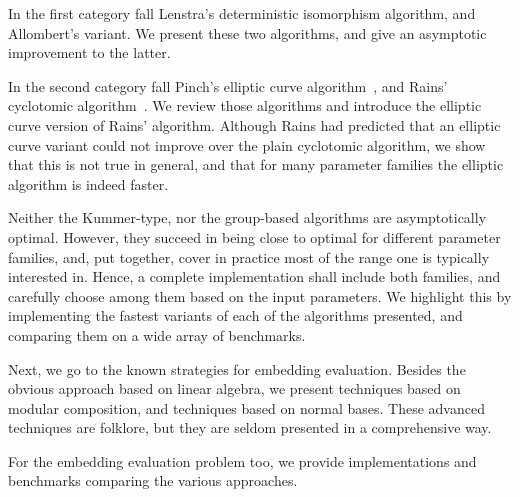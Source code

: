 \documentclass{article}
\begin{document}
In the first category fall Lenstra's deterministic isomorphism
algorithm\cite{LenstraJr91}, and Allombert's
variant\cite{Allombert02}. We present these two algorithms, and give
an asymptotic improvement to the latter.

In the second category fall Pinch's elliptic curve
algorithm~\cite{Pinch}, and Rains' cyclotomic
algorithm~\cite{rains2008}. We review those algorithms and introduce
the elliptic curve version of Rains' algorithm. Although Rains had
predicted that an elliptic curve variant could not improve over the
plain cyclotomic algorithm, we show that this is not true in general,
and that for many parameter families the elliptic algorithm is indeed
faster.

Neither the Kummer-type, nor the group-based algorithms are
asymptotically optimal. However, they succeed in being close to
optimal for different parameter families, and, put together, cover in
practice most of the range one is typically interested in. Hence, a
complete implementation shall include both families, and carefully
choose among them based on the input parameters. We highlight this by
implementing the fastest variants of each of the algorithms presented,
and comparing them on a wide array of benchmarks.

Next, we go to the known strategies for embedding evaluation. Besides
the obvious approach based on linear algebra, we present techniques
based on modular composition, and techniques based on normal
bases. These advanced techniques are folklore, but they are seldom
presented in a comprehensive way.

For the embedding evaluation problem too, we provide implementations
and benchmarks comparing the various approaches.




\end{document}
